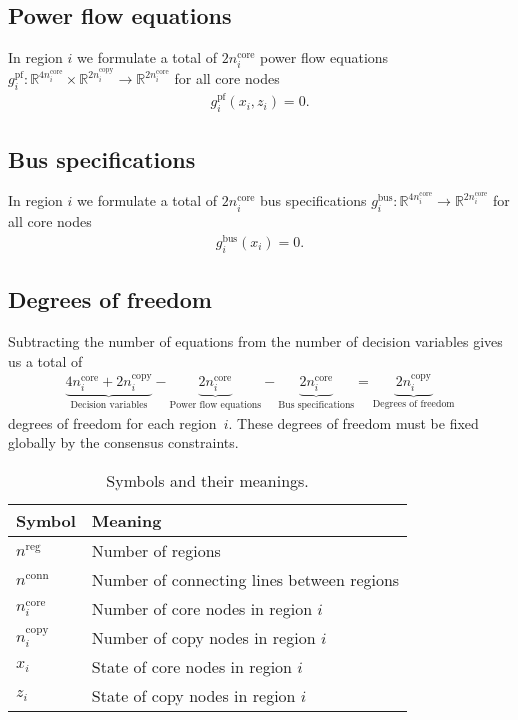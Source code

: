 \documentclass{article}
\newcommand{\nregions}{n^{\text{reg}}}
\newcommand{\nconnections}{n^{\text{conn}}}
\newcommand{\ncore}{n^\text{core}}
\newcommand{\ncopy}{n^\text{copy}}
\newcommand{\stateCore}{x}
\newcommand{\stateCopy}{z}
\newcommand{\pf}{g^{\text{pf}}}
\newcommand{\busspecs}{g^{\text{bus}}}
\begin{document}
\subsection{Power flow equations}
In region $i$ we formulate a total of $2 \ncore_i$ power flow equations $\pf_i \colon \mathbb{R}^{4 \ncore_i} \times \mathbb{R}^{2 \ncopy_i} \rightarrow \mathbb{R}^{2 \ncore_i}$ for all core nodes
\begin{align}
    \pf_i( \stateCore_i, \stateCopy_i) = 0.
\end{align}

\subsection{Bus specifications}
In region $i$ we formulate a total of $2 \ncore_i$ bus specifications $\busspecs_i \colon \mathbb{R}^{4 \ncore_i} \rightarrow \mathbb{R}^{2 \ncore_i}$ for all core nodes
\begin{align}
    \busspecs_i( \stateCore_i) = 0.
\end{align}

\subsection{Degrees of freedom}

Subtracting the number of equations from the number of decision variables gives us a total of
\begin{align}
    \underbrace{4 \ncore_i + 2 \ncopy_i}_{\text{Decision variables}} - \underbrace{2 \ncore_i}_{\text{Power flow equations}} - \underbrace{2 \ncore_i}_{\text{Bus specifications}} = \underbrace{2 \ncopy_i}_{\text{Degrees of freedom}}
\end{align}
degrees of freedom for each region~$i$.
These degrees of freedom must be fixed globally by the consensus constraints.

\begin{table}
    \centering
    \caption{Symbols and their meanings.\label{tab:symbols-and-meanings}}
    \begin{tabular}{ll}
        \toprule
        Symbol & Meaning \\
        \midrule
        $\nregions$ & Number of regions \\
        $\nconnections$ & Number of connecting lines between regions \\
        $\ncore_{i}$ & Number of core nodes in region $i$ \\
        $\ncopy_{i}$ & Number of copy nodes in region $i$ \\
        \midrule
        $\stateCore_{i}$ & State of core nodes in region $i$ \\
        $\stateCopy_{i}$ & State of copy nodes in region $i$ \\
        \bottomrule
    \end{tabular}
\end{table}
\end{document}
